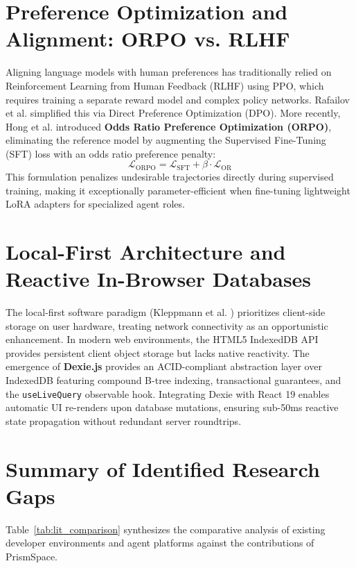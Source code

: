 \documentclass[12pt,a4paper]{report}
\begin{document}
\section{Preference Optimization and Alignment: ORPO vs. RLHF}
Aligning language models with human preferences has traditionally relied on Reinforcement Learning from Human Feedback (RLHF) \cite{ref_rlhf} using PPO, which requires training a separate reward model and complex policy networks. Rafailov et al. \cite{ref_dpo} simplified this via Direct Preference Optimization (DPO). More recently, Hong et al. \cite{ref_orpo} introduced \textbf{Odds Ratio Preference Optimization (ORPO)}, eliminating the reference model by augmenting the Supervised Fine-Tuning (SFT) loss with an odds ratio preference penalty:
\begin{equation}
    \mathcal{L}_{\mathrm{ORPO}} = \mathcal{L}_{\mathrm{SFT}} + \beta \cdot \mathcal{L}_{\mathrm{OR}}
\end{equation}
This formulation penalizes undesirable trajectories directly during supervised training, making it exceptionally parameter-efficient when fine-tuning lightweight LoRA adapters for specialized agent roles.

\section{Local-First Architecture and Reactive In-Browser Databases}
The local-first software paradigm (Kleppmann et al. \cite{ref_local_first}) prioritizes client-side storage on user hardware, treating network connectivity as an opportunistic enhancement. In modern web environments, the HTML5 IndexedDB API provides persistent client object storage but lacks native reactivity. The emergence of \textbf{Dexie.js} \cite{ref_dexie} provides an ACID-compliant abstraction layer over IndexedDB featuring compound B-tree indexing, transactional guarantees, and the \texttt{useLiveQuery} observable hook. Integrating Dexie with React 19 enables automatic UI re-renders upon database mutations, ensuring sub-50ms reactive state propagation without redundant server roundtrips.

\section{Summary of Identified Research Gaps}
Table~\ref{tab:lit_comparison} synthesizes the comparative analysis of existing developer environments and agent platforms against the contributions of PrismSpace.
\end{document}
